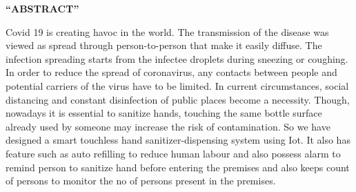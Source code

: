 


\newpage
\begin{center}
	\LARGE{\textbf{“ABSTRACT”} }
\end{center}

\vspace{1.00cm}

 Covid 19 is creating havoc in the world. The transmission of the disease was viewed as spread through person-to-person that make it easily diffuse. The infection spreading starts from the infectee droplets during sneezing or coughing. In order to reduce the spread of coronavirus, any contacts between people and potential carriers of the virus have to be limited. In current circumstances, social distancing and constant disinfection of public places become a necessity. Though, nowadays it is essential to sanitize hands, touching the same bottle surface already used by someone may increase the risk of contamination. So we have designed a smart touchless hand sanitizer-dispensing system using Iot. It also has feature such as auto refilling to reduce human labour and also possess alarm to remind person to sanitize hand before entering the premises and also keeps count of persons to monitor the no of  persons present in the premises.















	
	
	



